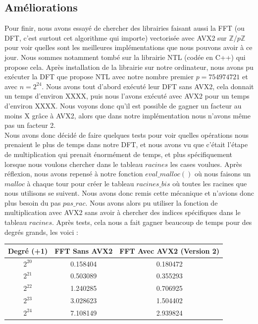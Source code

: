 \documentclass[12pt, a4paper]{article}
\begin{document}
\subsection{Améliorations}
\label{NTL}
Pour finir, nous avons essayé de chercher des librairies faisant aussi la FFT (ou DFT, c'est surtout cet algorithme qui importe) vectorisée avec AVX2 sur $\mathbb{Z}/p\mathbb{Z}$ pour voir quelles sont les meilleures implémentations que nous pouvons avoir à ce jour. Nous sommes notamment tombé sur la librairie NTL (codée en C++) qui propose cela. Après installation de la librairie sur notre ordinateur, nous avons pu exécuter la DFT que propose NTL avec notre nombre premier $p = 754974721$ et avec $n = 2^{24}$. Nous avons tout d'abord exécuté leur DFT sans AVX2, cela donnait un temps d'environ XXXX, puis nous l'avons exécuté avec AVX2 pour un temps d'environ XXXX. Nous voyons donc qu'il est possible de gagner un facteur au moins X grâce à AVX2, alors que dans notre implémentation nous n'avons même pas un facteur 2. \\
\indent Nous avons donc décidé de faire quelques tests pour voir quelles opérations nous prenaient le plus de temps dans notre DFT, et nous avons vu que c'était l'étape de multiplication qui prenait énormément de temps, et plus spécifiquement lorsque nous voulons chercher dans le tableau $racines$ les cases voulues. Après réflexion, nous avons repensé à notre fonction $eval\_malloc()$ où nous faisons un $malloc$ à chaque tour pour créer le tableau $racines\_bis$ où toutes les racines que nous utilisons se suivent. Nous avons donc remis cette mécanique et n'avions donc plus besoin du pas $pas\_rac$. Nous avons alors pu utiliser la fonction de multiplication avec AVX2 sans avoir à chercher des indices spécifiques dans le tableau $racines$. 
\newpage
Après tests, cela nous a fait gagner beaucoup de temps pour des degrés grands, les voici : 

\begin{center}
\begin{tabular}{||c c c||}
\hline
Degré (+1) & FFT Sans AVX2 & FFT Avec AVX2 (Version 2) \\
\hline\hline
$2^{20}$ & 0.158404 & 0.180472\protect\footnotemark \\
\hline
$2^{21}$ & 0.503089 & 0.355293 \\
\hline
$2^{22}$ & 1.240285 & 0.706925 \\
\hline
$2^{23}$ & 3.028623 & 1.504402 \\
\hline
$2^{24}$ & 7.108149 & 2.939824 \\
\hline
\end{tabular}
\end{center}
{}
\ \\
\end{document}
